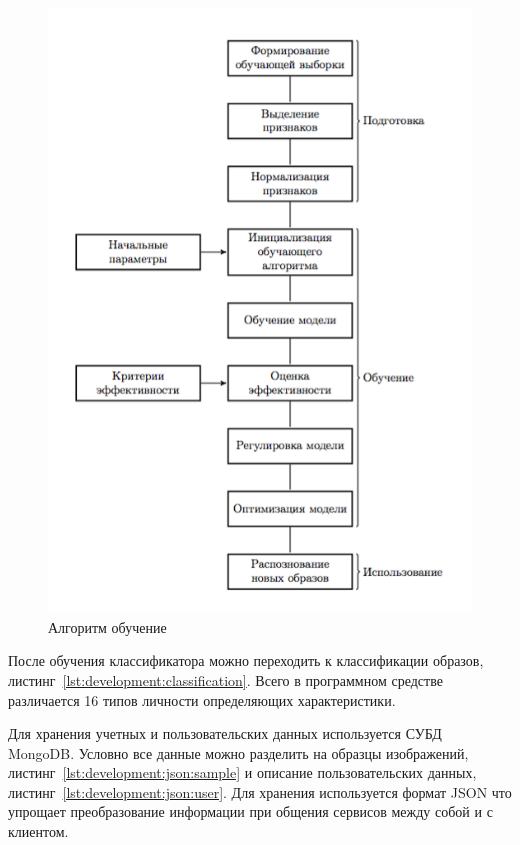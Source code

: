 \begin{figure}[ht]
    \centering
    \includegraphics[width=1\textwidth]{figures/SVM_flow.png}
    \caption{Алгоритм обучение}
    \label{fig:develoipment:svm_flow}
\end{figure}

После обучения классификатора можно переходить к классификации образов, листинг~\ref{lst:development:classification}. Всего в программном средстве различается 16 типов личности определяющих характеристики.



Для хранения учетных и пользовательских данных используется СУБД MongoDB. Условно все данные можно разделить на образцы изображений, листинг~\ref{lst:development:json:sample} и описание пользовательских данных, листинг~\ref{lst:development:json:user}. Для хранения используется формат JSON что упрощает преобразование информации при общения сервисов между собой и с клиентом. 

